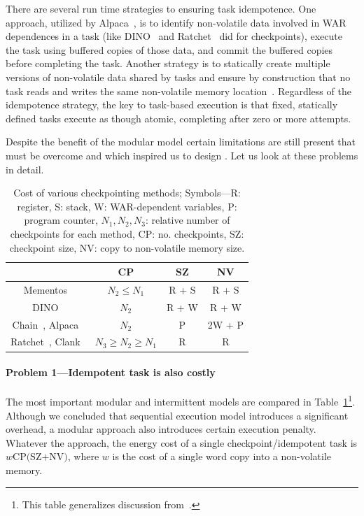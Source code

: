 There are several run time strategies to ensuring task idempotence. One approach, utilized by Alpaca~\cite{alpaca}, is to identify non-volatile data involved in WAR dependences in a task (like DINO~\cite{dino} and Ratchet~\cite{rachet} did for checkpoints), execute the task using buffered copies of those data, and commit the buffered copies before completing the task. Another strategy is to statically create multiple versions of non-volatile data shared by tasks and ensure by construction that no task reads and writes the same non-volatile memory location~\cite{chain}. Regardless of the idempotence strategy, the key to task-based execution is that fixed, statically defined tasks execute as though atomic, completing after zero or more attempts. 

Despite the benefit of the modular model certain limitations are still present that must be overcome and which inspired us to design \sys. Let us look at these problems in detail.

\begin{table}
	\centering
	\footnotesize
	\begin{tabular}{|c|c|c|c|}
		\hline
		{~} & CP & SZ & NV \\
		\hline\hline
		\!\!Mementos~\cite{mementos}\!\! & \!\!$N_2\leq N_1$\!\! & \!\!R + S\!\! & \!\!R + S\!\! \\
		\!\!DINO~\cite{dino}\!\! & $N_2$\!\! & \!\!R + W\!\! & \!\!R + W\!\! \\
		\!\!Chain~\cite{chain}, Alpaca~\cite{alpaca}\!\! & \!\!$N_2$\!\! & P\!\! & \!\!2W + P\!\!\\
		\!\!Ratchet~\cite{ratchet}, Clank~\cite{hicks_isca_2017}\!\! & $N_3\geq N_2\geq N_1$\!\! & \!\!R\!\! & R\!\!\\
		\hline 
	\end{tabular}
	\caption{Cost of various checkpointing methods; Symbols---R: register, S: stack, W: WAR-dependent variables, P: program counter, $N_1, N_2, N_3$: relative number of checkpoints for each method, CP: no. checkpoints, SZ: checkpoint size, NV: copy to non-volatile memory size.}
	\label{table:chechpoint_comparison}
\end{table}

\paragraph{Problem 1---Idempotent task is also costly}

The most important modular and intermittent models are compared in Table~\ref{table:chechpoint_comparison}\footnote{This table generalizes discussion from~\cite[Sec. 2.4]{alpaca}.}. Although we concluded that sequential execution model introduces a significant overhead, a modular approach also introduces certain execution penalty. Whatever the approach, the energy cost of a single checkpoint/idempotent task is $w\text{CP(SZ+NV)}$, where $w$ is the cost of a single word copy into a non-volatile memory. 


